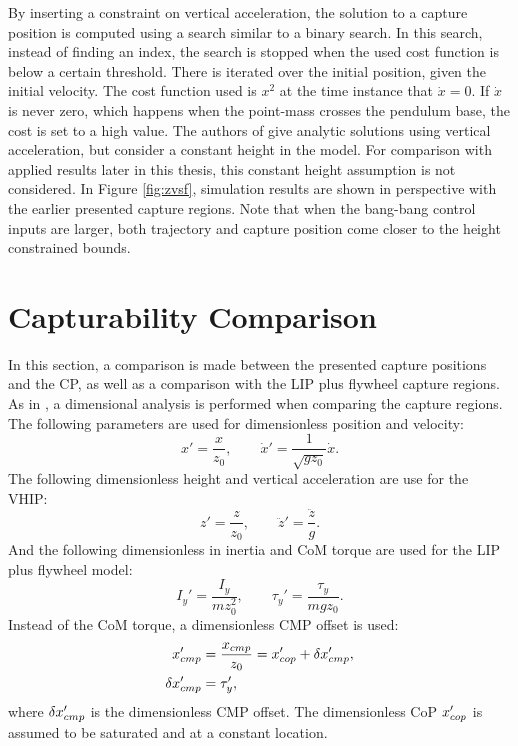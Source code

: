 By inserting a constraint on vertical acceleration, the solution to a capture position is computed using a search similar to a binary search. In this search, instead of finding an index, the search is stopped when the used cost function is below a certain threshold. There is iterated over the initial position, given the initial velocity. The cost function used is $x^2$ at the time instance that $\dot{x}=0$.  If $\dot{x}$ is never zero, which happens when the point-mass crosses the pendulum base, the cost is set to a high value. The authors of \cite{gao2017increase} give analytic solutions using vertical acceleration, but consider a constant height in the model. For comparison with applied results later in this thesis, this constant height assumption is not considered. In Figure \ref{fig:zvsf}, simulation results are shown in perspective with the earlier presented capture regions. Note that when the bang-bang control inputs are larger, both trajectory and capture position come closer to the height constrained bounds.

\section{Capturability Comparison}
In this section, a comparison is made between the presented capture positions and the \ac{CP}, as well as a comparison with the \ac{LIP} plus flywheel capture regions. As in \cite{pratt2006capture, stephens2007humanoid, koolen2012capturability}, a dimensional analysis \cite{mcmahon1983size} is performed when comparing the capture regions. The following parameters are used for dimensionless position and velocity:
\begin{equation}
	x' = \frac{x}{z_0}, \qquad \dot{x}' = \frac{1}{\sqrt{gz_0}}\dot{x}.
\end{equation}
The following dimensionless height and vertical acceleration are use for the \ac{VHIP}:
\begin{equation}
 z' = \frac{z}{z_0}, \qquad \ddot{z}'=\frac{\ddot{z}}{g}.
\end{equation}
And the following dimensionless in inertia and \ac{CoM} torque are used for the \ac{LIP} plus flywheel model:
\begin{equation}
I_y'=\frac{I_y}{mz_0^2}, \qquad \tau_y' = \frac{\tau_y}{mgz_0}.
\end{equation}
Instead of the \ac{CoM} torque, a dimensionless \ac{CMP} offset is used:
\begin{align}
	x_{cmp}' &=\frac{x_{cmp}}{z_0}=x_{cop}' + \delta x_{cmp}',\\
	\delta x_{cmp}' &=\tau_y',
\end{align}
where $\delta x_{cmp}'$ is the dimensionless \ac{CMP} offset. The dimensionless \ac{CoP} $x_{cop}'$ is assumed to be saturated and at a constant location.

